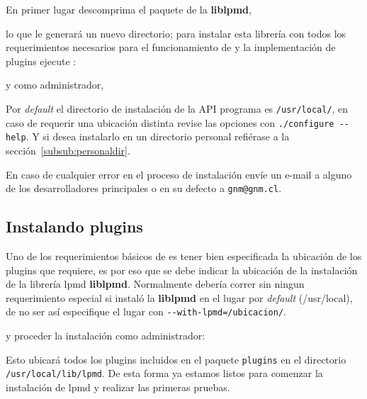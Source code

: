 En primer lugar descomprima el paquete de la \textbf{liblpmd},


lo que le generar\'a un nuevo directorio; para instalar esta librer\'ia con todos los requerimientos necesarios para el funcionamiento de \lpmd y la implementaci\'on de plugins ejecute :


y como administrador,




Por \textit{default} el directorio de instalaci\'on de la API programa es \verb|/usr/local/|, en caso de requerir una ubicaci\'on distinta revise las opciones con \verb|./configure --help|. Y si desea instalarlo en un directorio personal refi\'erase a la secci\'on~\ref{subsub:personaldir}.

En caso de cualquier error en el proceso de instalaci\'on env\'ie un e-mail a alguno de los desarrolladores principales o en su defecto a \verb|gnm@gnm.cl|.

\subsection{Instalando plugins}

Uno de los requerimientos b\'asicos de \lpmd es tener bien especificada la ubicaci\'on de los plugins que \lpmd requiere, es por eso que se debe indicar la ubicaci\'on de la instalaci\'on de la librer\'ia lpmd \textbf{liblpmd}. Normalmente deber\'ia correr sin ningun requerimiento especial si instal\'o la \textbf{liblpmd} en el lugar por \textit{default} (/usr/local), de no ser as\'i especifique el lugar con \verb|--with-lpmd=/ubicacion/|.


y proceder la instalaci\'on como administrador:


Esto ubicar\'a todos los plugins incluidos en el paquete \verb|plugins| en el directorio \verb|/usr/local/lib/lpmd|. De esta forma ya estamos listos para comenzar la instalaci\'on de lpmd y realizar las primeras pruebas.

